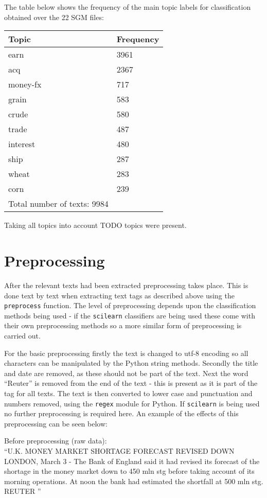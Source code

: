 \documentclass{article}
\begin{document}
The table below shows the frequency of the main topic labels for classification obtained over the 22 SGM files:
\\
\begin{center}
\begin{tabular}{l | l}
Topic & Frequency \\ \hline
earn & 3961 \\
acq & 2367 \\
money-fx & 717 \\
grain & 583 \\
crude & 580 \\
trade & 487 \\
interest & 480 \\
ship & 287 \\
wheat & 283 \\
corn & 239 \\ \hline
Total number of texts: 9984 \\
\end{tabular}
\end{center}

Taking all topics into account TODO topics were present.

\section{Preprocessing}
After the relevant texts had been extracted preprocessing takes place. This is done text by text when extracting text tags as described above using the \verb|preprocess| function. The level of preprocessing depends upon the classification methods being used - if the \verb|scilearn| classifiers are being used these come with their own preprocessing methods so a more similar form of preprocessing is carried out.

For the basic preprocessing firstly the text is changed to utf-8 encoding so all characters can be manipulated by the Python string methods. Secondly the title and date are removed, as these should not be part of the text. Next the word ``Reuter'' is removed from the end of the text - this is present as it is part of the tag for all texts. The text is then converted to lower case and punctuation and numbers removed, using the \verb|regex| module for Python. If \verb|scilearn| is being used no further preprocessing is required here. An example of the effects of this preprocessing can be seen below:

Before preprocessing (raw data):
\\``U.K. MONEY MARKET SHORTAGE FORECAST REVISED DOWN
    LONDON, March 3 - The Bank of England said it had revised
its forecast of the shortage in the money market down to 450
mln stg before taking account of its morning operations. At
noon the bank had estimated the shortfall at 500 mln stg.
 REUTER
''
\end{document}
